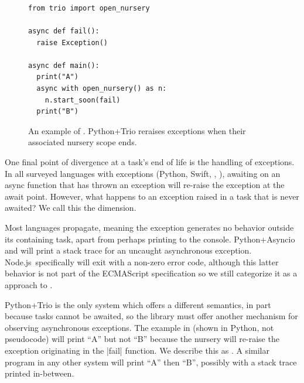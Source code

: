 \subsubsection{\Propagation}\label{ssec:designdims:propagation}

\begin{figure}
\begin{lstlisting}[language=Py]
from trio import open_nursery

async def fail():
  raise Exception()

async def main():
  print("A")
  async with open_nursery() as n:
    n.start_soon(fail)
  print("B")
\end{lstlisting}
  \cprotect\caption{An example of \destruct \propagation. Python+Trio reraises exceptions when their associated nursery scope ends.}
  \label{fig:propagation:trio}
\end{figure}

One final point of divergence at a task's end of life is the handling of exceptions. In all surveyed languages with exceptions (Python, Swift, \Js, \CSharp), awaiting on an async function that has thrown an exception will re-raise the exception at the await point.\footnotemark{} However, what happens to an exception raised in a task that is never awaited? We call this the \propagation dimension.%
\cprotect{}

Most languages \never propagate, meaning the exception generates no behavior outside its containing task, apart from perhaps printing to the console. Python+Asyncio and \Js will print a stack trace for an uncaught asynchronous exception. Node.js\ specifically will exit with a non-zero error code, although this latter behavior is not part of the ECMAScript specification so we still categorize it as a \never approach to \propagation.

Python+Trio is the only system which offers a different semantics, in part because tasks cannot be awaited, so the library must offer another mechanism for observing asynchronous exceptions. The example in  (shown in Python, not pseudocode) will print ``A'' but not ``B'' because the nursery will re-raise the exception originating in the \code|fail| function. We describe this as \destruct \propagation. A similar program in any other system will print ``A'' then ``B'', possibly with a stack trace printed in-between.

